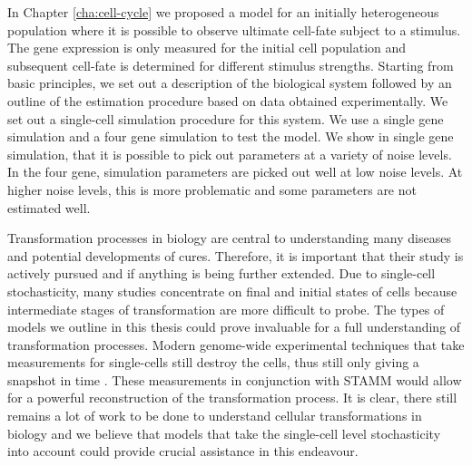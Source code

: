 In Chapter \ref{cha:cell-cycle} we proposed a model for an initially heterogeneous population where it is possible to observe ultimate cell-fate subject to a stimulus. The gene expression is only measured for the initial cell population and subsequent cell-fate is determined for different stimulus strengths. Starting from basic principles, we set out a description of the biological system followed by an outline of the estimation procedure based on data obtained experimentally. We set out a single-cell simulation procedure for this system. We use a single gene simulation and a four gene simulation to test the model. We show in single gene simulation, that it is possible to pick out parameters at a variety of noise levels. In the four gene, simulation parameters are picked out well at low noise levels. At higher noise levels, this is more problematic and some parameters are not estimated well.

Transformation processes in biology are central to understanding many diseases and potential developments of cures. Therefore, it is important that their study is actively pursued and if anything is being further extended. Due to single-cell stochasticity, many studies concentrate on final and initial states of cells because intermediate stages of transformation are more difficult to probe. The types of models we outline in this thesis could prove invaluable for a full understanding of transformation processes. Modern genome-wide experimental techniques that take measurements for single-cells still destroy the cells, thus still only giving a snapshot in time \citep{deSouza:2012dz}. These measurements in conjunction with STAMM would allow for a powerful reconstruction of the transformation process. It is clear, there still remains a lot of work to be done to understand cellular transformations in biology and we believe that models that take the single-cell level stochasticity into account could provide crucial assistance in this endeavour.

